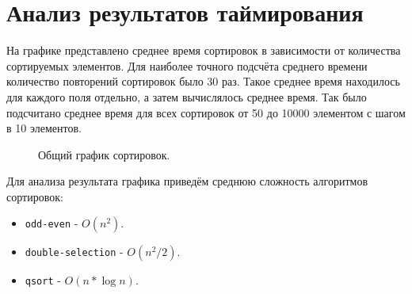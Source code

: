 \section{Анализ результатов таймирования}

\pgfplotsset{compat=1.9}

На графике представлено среднее время сортировок в зависимости от количества сортируемых элементов.
Для наиболее точного подсчёта среднего времени количество повторений сортировок было 30 раз.
Такое среднее время находилось для каждого поля отдельно, а затем вычислялось среднее время.
Так было подсчитано среднее время для всех сортировок от 50 до 10000 элементом с шагом в 10 элементов.

\begin{figure}[H]
    \centering
    \caption{Общий график сортировок.}
\end{figure}

Для анализа результата графика приведём среднюю сложность алгоритмов сортировок:

\begin{itemize}
    \item \texttt{odd-even} - $O(n^2)$.
    \item \texttt{double-selection} - $O(n^2 / 2)$.
    \item \texttt{qsort} - $O(n * \log n)$.
\end{itemize}

